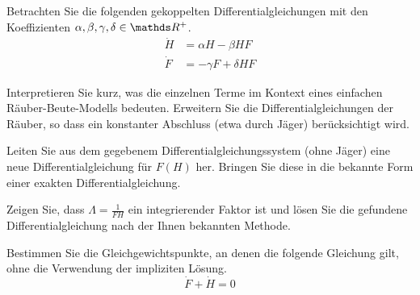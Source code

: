 \begin{atiTask}[
  title = Räuber und Beute
]
  Betrachten Sie die folgenden gekoppelten Differentialgleichungen mit den Koeffizienten $\alpha,\beta,\gamma,\delta\in\setR^+$.
  \begin{align*}
    \dot{H} &= \alpha H - \beta HF \\
    \dot{F} &= -\gamma F + \delta HF
  \end{align*}
  \begin{atiSubtasks}
    \item{
      Interpretieren Sie kurz, was die einzelnen Terme im Kontext eines einfachen Räuber-Beute-Modells bedeuten.
      Erweitern Sie die Differentialgleichungen der Räuber, so dass ein konstanter Abschluss (etwa durch Jäger) berücksichtigt wird.
    }
    \item{
      Leiten Sie aus dem gegebenem Differentialgleichungssystem (ohne Jäger) eine neue Differentialgleichung für $F(H)$ her.
      Bringen Sie diese in die bekannte Form einer exakten Differentialgleichung.
    }
    \item{
      Zeigen Sie, dass $\Lambda = \frac{1}{FH}$ ein integrierender Faktor ist und lösen Sie die gefundene Differentialgleichung nach der Ihnen bekannten Methode.
    }
    \item{
      Bestimmen Sie die Gleichgewichtspunkte, an denen die folgende Gleichung gilt, ohne die Verwendung der impliziten Lösung.
      \[
        \dot{F} + \dot{H} = 0
      \]
    }
  \end{atiSubtasks}
\end{atiTask}